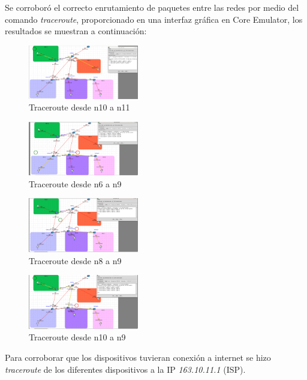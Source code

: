 \documentclass[letterpaper, 10 pt, conference]{ieeeconf}  %
\begin{document}
Se corroboró el correcto enrutamiento de paquetes entre las redes por medio del comando \textit{traceroute}, proporcionado en una interfaz gráfica en Core Emulator, los resultados se muestran a continuación:


\begin{figure}[H]
	\centering
	\includegraphics[width=0.43\textwidth]{./Imagenes/traceroute_1.png}
	\caption{Traceroute desde n10 a n11}
\end{figure}
\begin{figure}[H]
	\centering
	\includegraphics[width=0.43\textwidth]{./Imagenes/traceroute_2.png}
	\caption{Traceroute desde n6 a n9}
\end{figure}
\begin{figure}[H]
	\centering
	\includegraphics[width=0.43\textwidth]{./Imagenes/traceroute_3.png}
	\caption{Traceroute desde n8 a n9}
\end{figure}
\begin{figure}[H]
	\centering
	\includegraphics[width=0.43\textwidth]{./Imagenes/traceroute_4.png}
	\caption{Traceroute desde n10 a n9}
\end{figure}

Para corroborar que los dispositivos tuvieran conexión a internet se hizo \textit{traceroute} de los diferentes dispositivos a la IP \textit{163.10.11.1} (ISP).
\end{document}
